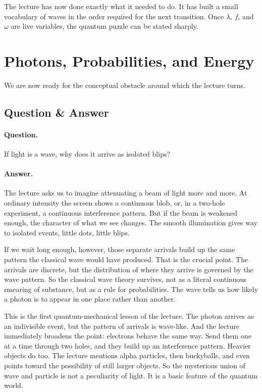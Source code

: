 The lecture has now done exactly what it needed to do. It has built a small vocabulary of waves in the order required for the next transition. Once \(\lambda\), \(f\), and \(\omega\) are live variables, the quantum puzzle can be stated sharply.

\section{Photons, Probabilities, and Energy}

We are now ready for the conceptual obstacle around which the lecture turns.

\subsection{Question \& Answer}

\paragraph{Question.} If light is a wave, why does it arrive as isolated blips?

\paragraph{Answer.} The lecture asks us to imagine attenuating a beam of light more and more. At ordinary intensity the screen shows a continuous blob, or, in a two-hole experiment, a continuous interference pattern. But if the beam is weakened enough, the character of what we see changes. The smooth illumination gives way to isolated events, little dots, little blips.

If we wait long enough, however, those separate arrivals build up the same pattern the classical wave would have produced. That is the crucial point. The arrivals are discrete, but the distribution of where they arrive is governed by the wave pattern. So the classical wave theory survives, not as a literal continuous smearing of substance, but as a rule for probabilities. The wave tells us how likely a photon is to appear in one place rather than another.

This is the first quantum-mechanical lesson of the lecture. The photon arrives as an indivisible event, but the pattern of arrivals is wave-like. And the lecture immediately broadens the point: electrons behave the same way. Send them one at a time through two holes, and they build up an interference pattern. Heavier objects do too. The lecture mentions alpha particles, then buckyballs, and even points toward the possibility of still larger objects. So the mysterious union of wave and particle is not a peculiarity of light. It is a basic feature of the quantum world.

